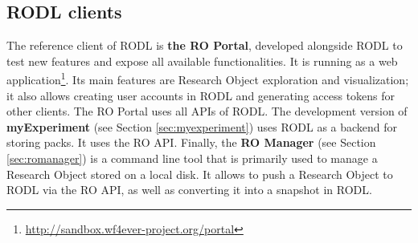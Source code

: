 \subsection{RODL clients}


The reference client of RODL is \textbf{the RO Portal}, developed alongside RODL to test new features and expose all available functionalities. It is running as a web application\footnote{\url{http://sandbox.wf4ever-project.org/portal}}. Its main features are Research Object exploration and visualization; it also allows creating user accounts in RODL and generating access tokens for other clients. The RO Portal uses all APIs of RODL. %
The development version of \textbf{myExperiment} (see Section \ref{sec:myexperiment}) %
 uses RODL as a backend for storing packs. It uses the RO API. Finally, the \textbf{RO Manager} (see Section \ref{sec:romanager}) %
is a command line tool that is primarily used to manage a Research Object stored on a local disk. It allows to push a Research Object to RODL via the RO API, as well as converting it into a snapshot in RODL.

